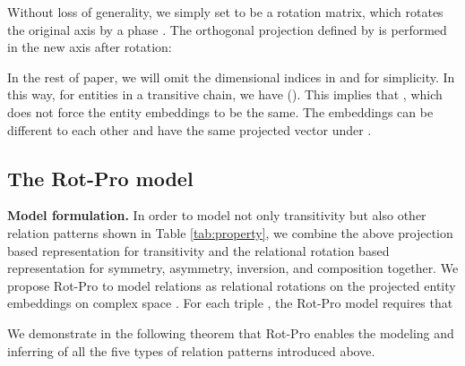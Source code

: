 \documentclass{article}
\begin{document}
Without loss of generality, we simply set  to be a rotation matrix, which rotates the original axis by a phase .
The orthogonal projection  defined by  is performed in the new axis after rotation:

In the rest of paper, we will omit the dimensional indices  in  and  for simplicity. In this way, for entities  in a transitive chain, we have  (). This implies that , which does not force the entity embeddings  to be the same. The embeddings  can be different to each other and have the same projected vector under .

\subsection{The Rot-Pro model}
\textbf{Model formulation.}  In order to model not only transitivity but also other relation patterns shown in Table \ref{tab:property}, we combine the above projection based representation for transitivity and the relational rotation based representation for symmetry, asymmetry, inversion, and composition together. We propose Rot-Pro to model relations as relational rotations on the projected entity embeddings on complex space .
For each triple , the Rot-Pro model requires that

We demonstrate in the following theorem that Rot-Pro enables the modeling and inferring of all the five types of relation patterns introduced above.
\end{document}
